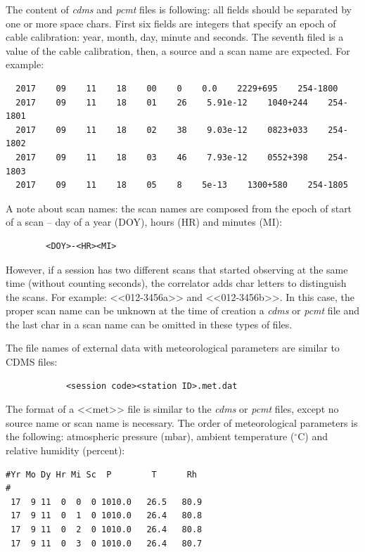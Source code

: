 \documentclass [10pt,letterpaper]{report}
\begin{document}
The content of {\sl cdms} and {\sl pcmt} files is following: all fields should be
separated by one or more space chars. First six fields are integers that
specify an epoch of cable calibration: year, month, day, minute and seconds.
The seventh filed is a value of the cable calibration, then, a source and
a scan name are expected. For example:
\begin{verbatim}
  2017    09    11    18    00    0    0.0    2229+695    254-1800
  2017    09    11    18    01    26    5.91e-12    1040+244    254-1801
  2017    09    11    18    02    38    9.03e-12    0823+033    254-1802
  2017    09    11    18    03    46    7.93e-12    0552+398    254-1803
  2017    09    11    18    05    8    5e-13    1300+580    254-1805
\end{verbatim}
\noindent
A note about scan names: the scan names are composed from the epoch of start
of a scan -- day of a year (DOY), hours (HR) and minutes (MI):
\begin{verbatim}
        <DOY>-<HR><MI>
\end{verbatim}
\noindent
However, if a session has two different scans that started observing at the
same time (without counting seconds), the correlator adds char letters to
distinguish the scans. For example: <<012-3456a>> and <<012-3456b>>. In this case,
the proper scan name can be unknown at the time of creation a {\sl cdms} or
{\sl pcmt} file and the last char in a scan name can be omitted in these types
of files.

The file names of external data with meteorological parameters are similar
to CDMS files:
\begin{verbatim}
            <session code><station ID>.met.dat
\end{verbatim}
\noindent
The format of a <<met>> file is similar to the {\sl cdms} or {\sl pcmt} files,
except no source name or scan name is necessary. The order of meteorological
parameters is the following: atmospheric pressure (mbar), ambient temperature
($^{\circ}$C) and relative humidity (percent):
\begin{verbatim}
#Yr Mo Dy Hr Mi Sc  P        T      Rh
#
 17  9 11  0  0  0 1010.0   26.5   80.9
 17  9 11  0  1  0 1010.0   26.4   80.8
 17  9 11  0  2  0 1010.0   26.4   80.8
 17  9 11  0  3  0 1010.0   26.4   80.7
\end{verbatim}
\end{document}
